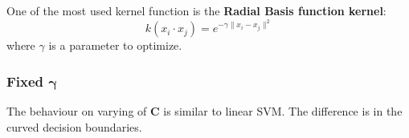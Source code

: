 \documentclass[10pt,a4paper]{article}
\begin{document}
One of the most used kernel function is the \textbf{Radial Basis function kernel}:
\begin{equation}
	k(x_i \cdot x_j) = e^{-\gamma\|x_i - x_j\|^2}
\end{equation}
where $\gamma$ is a parameter to optimize.

\subsubsection*{Fixed $\mathbf{\gamma}$}
The behaviour on varying of \textbf{C} is similar to linear SVM. The difference is in the curved decision boundaries.
\begin{figure}[!h]
	\centering
	\qquad\qquad
	\qquad\qquad

\end{figure}
\end{document}
